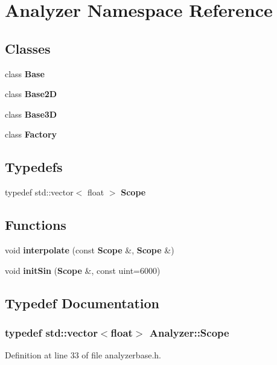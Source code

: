 \section{Analyzer Namespace Reference}
\label{namespaceAnalyzer}




\subsection*{Classes}
\begin{CompactItemize}
\item 
class {\bf Base}
\item 
class {\bf Base2D}
\item 
class {\bf Base3D}
\item 
class {\bf Factory}
\end{CompactItemize}
\subsection*{Typedefs}
\begin{CompactItemize}
\item 
typedef std::vector$<$ float $>$ {\bf Scope}
\end{CompactItemize}
\subsection*{Functions}
\begin{CompactItemize}
\item 
void {\bf interpolate} (const {\bf Scope} \&, {\bf Scope} \&)
\item 
void {\bf init\-Sin} ({\bf Scope} \&, const uint=6000)
\end{CompactItemize}


\subsection{Typedef Documentation}
\subsubsection{\setlength{\rightskip}{0pt plus 5cm}typedef std::vector$<$float$>$ {\bf Analyzer::Scope}}\label{namespaceAnalyzer_a0}




Definition at line 33 of file analyzerbase.h.

